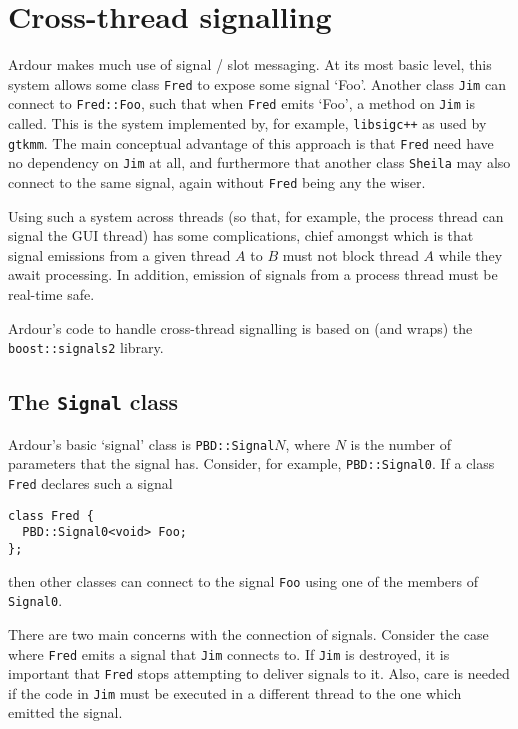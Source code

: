 \documentclass[10pt,a4paper]{book}
\newcommand{\code}[1]{\texttt{#1}}
\begin{document}
\section{Cross-thread signalling}

Ardour makes much use of signal / slot messaging.  At its most basic
level, this system allows some class \code{Fred} to expose some
signal `Foo'.  Another class \code{Jim} can connect to
\code{Fred::Foo}, such that when \code{Fred} emits `Foo', a method
on \code{Jim} is called.  This is the system implemented by, for
example, \code{libsigc++} as used by \code{gtkmm}.  The main
conceptual advantage of this approach is that \code{Fred} need have
no dependency on \code{Jim} at all, and furthermore that another
class \code{Sheila} may also connect to the same signal, again
without \code{Fred} being any the wiser.

Using such a system across threads (so that, for example, the process
thread can signal the GUI thread) has some complications, chief
amongst which is that signal emissions from a given thread $A$ to $B$
must not block thread $A$ while they await processing.  In addition,
emission of signals from a process thread must be real-time safe.

Ardour's code to handle cross-thread signalling is based on (and
wraps) the \code{boost::signals2} library.

\subsection{The \code{Signal} class}

Ardour's basic `signal' class is \code{PBD::Signal}$N$, where $N$ is
the number of parameters that the signal has.  Consider, for example,
\code{PBD::Signal0}.  If a class \code{Fred} declares such a signal

\begin{lstlisting}
class Fred {
  PBD::Signal0<void> Foo;
};
\end{lstlisting}

then other classes can connect to the signal \code{Foo} using one of
the members of \code{Signal0}.

There are two main concerns with the connection of signals.  Consider
the case where \code{Fred} emits a signal that \code{Jim} connects to.
If \code{Jim} is destroyed, it is important that \code{Fred} stops
attempting to deliver signals to it.  Also, care is needed if the code
in \code{Jim} must be executed in a different thread to the one which
emitted the signal.
\end{document}
